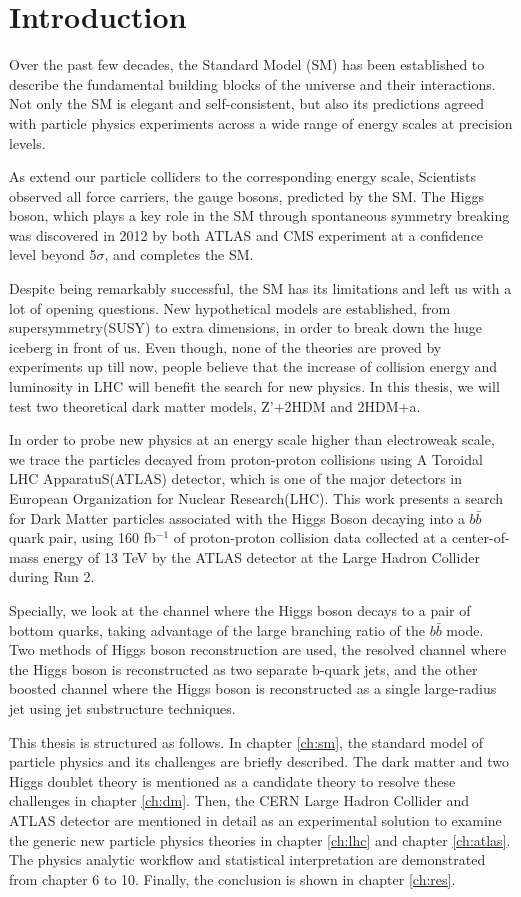 \chapter{Introduction}
Over the past few decades, the Standard Model (SM) has been established to describe the fundamental building blocks of the universe and their interactions.
 Not only the SM is elegant and self-consistent, but also its predictions agreed with particle physics experiments across a wide range of energy scales at precision levels. 


As extend our particle colliders to the corresponding energy scale, Scientists observed all force carriers, the gauge bosons, predicted by the SM.  
The Higgs boson, which plays a key role in the SM through spontaneous symmetry breaking was discovered in 2012 by both ATLAS and CMS experiment at a confidence level beyond 5$\sigma$,
  and completes the SM. \cite{Aad:2012tfa} \cite{Chatrchyan:2012xdj}


Despite being remarkably successful, the SM has its limitations and left us with a lot  of opening questions. 
New hypothetical models are established, from supersymmetry(SUSY) to extra dimensions,  
in order to break down the huge iceberg in front of us. Even though, none of the theories are proved by experiments up till now, 
people believe that the increase of collision energy and luminosity in LHC will benefit the search for new physics.
In this thesis, we will test two theoretical dark matter models, Z'+2HDM and 
2HDM+a. 

In order to probe new physics at an energy scale higher than electroweak scale,
 we trace the particles decayed from proton-proton collisions using A Toroidal LHC ApparatuS(ATLAS) detector,
 which is one of the major detectors in European Organization for Nuclear Research(LHC). This work presents a search for Dark Matter particles associated 
with the Higgs Boson decaying into a $b\bar{b}$ quark pair, using 160 fb$ ^{-1}$ of proton-proton collision data collected at a center-of-mass energy of 13 TeV 
by the ATLAS detector at the Large Hadron Collider during Run 2.

Specially, we look at the channel where the Higgs boson decays to a pair of bottom quarks, taking advantage of the large branching ratio of the $b\bar{b}$ mode. 
Two methods of Higgs boson reconstruction are used, the resolved channel where the Higgs boson is reconstructed as two separate b-quark jets, and the other boosted channel where the Higgs boson is reconstructed as a single large-radius jet using jet substructure techniques. 

 This thesis is structured as follows. 
In chapter \ref{ch:sm}, the standard model of particle physics and its challenges are briefly described. 
The dark matter and two Higgs doublet theory is mentioned as a candidate theory to resolve these challenges in chapter \ref{ch:dm}. 
Then, the CERN Large Hadron Collider and ATLAS detector are mentioned in detail as an experimental solution to examine the 
generic new particle physics theories in chapter \ref{ch:lhc} and chapter \ref{ch:atlas}. 
The physics analytic workflow and statistical interpretation are demonstrated from chapter 6 to 10. 
Finally, the conclusion is shown in chapter \ref{ch:res}.

